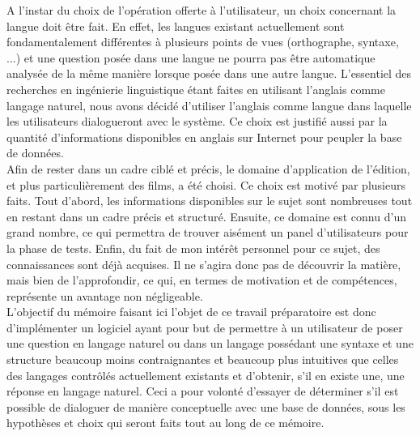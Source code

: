 \documentclass[a4paper,12pt]{article}
\begin{document}
A l'instar du choix de l'opération offerte à l'utilisateur, un choix concernant la langue doit être fait.
En effet, les langues existant actuellement sont fondamentalement différentes à plusieurs points de vues (orthographe, syntaxe, ...) et une question posée dans une langue ne pourra pas être automatique analysée de la même manière lorsque posée dans une autre langue.
L'essentiel des recherches en ingénierie linguistique étant faites en utilisant l'anglais comme langage naturel, nous avons décidé d'utiliser l'anglais comme langue dans laquelle les utilisateurs dialogueront avec le système.
Ce choix est justifié aussi par la quantité d'informations disponibles en anglais sur Internet pour peupler la base de données. \\

Afin de rester dans un cadre ciblé et précis, le domaine d'application de l'édition, et plus particulièrement des films, a été choisi.
Ce choix est motivé par plusieurs faits.
Tout d'abord, les informations disponibles sur le sujet sont nombreuses tout en restant dans un cadre précis et structuré.
Ensuite, ce domaine est connu d'un grand nombre, ce qui permettra de trouver aisément un panel d'utilisateurs pour la phase de tests.
Enfin, du fait de mon intérêt personnel pour ce sujet, des connaissances sont déjà acquises.
Il ne s'agira donc pas de découvrir la matière, mais bien de l'approfondir, ce qui, en termes de motivation et de compétences, représente un avantage non négligeable. \\

L'objectif du mémoire faisant ici l'objet de ce travail préparatoire est donc d'implémenter un logiciel ayant pour but de permettre à un utilisateur de poser une question en langage naturel ou dans un langage possédant une syntaxe et une structure beaucoup moins contraignantes et beaucoup plus intuitives que celles des langages contrôlés actuellement existants et d'obtenir, s'il en existe une, une réponse en langage naturel.
Ceci a pour volonté d'essayer de déterminer s'il est possible de dialoguer de manière conceptuelle avec une base de données, sous les hypothèses et choix qui seront faits tout au long de ce mémoire. \\
\end{document}
